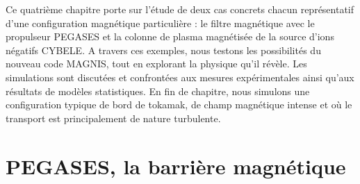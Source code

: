 \begin{refsection}
Ce quatrième chapitre porte sur l'étude de deux cas concrets
chacun représentatif d'une configuration magnétique particulière : le filtre
magnétique avec le propulseur PEGASES et la colonne de plasma magnétisée de la
source d'ions négatifs CYBELE. 
A travers ces exemples, nous testons les possibilités du nouveau code MAGNIS,
tout en explorant la physique qu'il révèle. Les simulations sont discutées et
confrontées aux mesures expérimentales ainsi qu'aux résultats de modèles
statistiques.
En fin de chapitre, nous simulons une configuration typique de bord de tokamak,
de champ magnétique intense et où le transport est principalement de nature
turbulente. 
		 
\section{PEGASES, la barrière magnétique}

\end{refsection}
